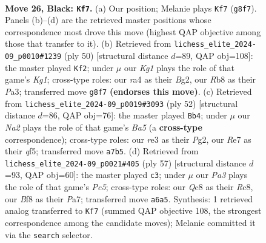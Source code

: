 \documentclass[11pt]{article}
\begin{document}
\clearpage

\begin{figure}[p]\centering
\begin{subfigure}{0.46\textwidth}\centering
\resizebox{\linewidth}{!}{%
\newchessgame
\chessboard[
  setfen={1rq2bk1/n1p1r3/p2p1pp1/3P3p/RP1NP3/4R2P/3B1PP1/1Q4K1 b - - 2 26},
  showmover=false,
  pgfstyle=straightmove, color=movearrow, markmove={g8-f7}
]}
\caption{}
\end{subfigure}\hfill
\begin{subfigure}{0.46\textwidth}\centering
\resizebox{\linewidth}{!}{%
\newchessgame
\chessboard[
  setfen={2rq4/p4pk1/2r1p1p1/1R1p1b1p/3P1P1P/P1P3P1/1Q2P1B1/2R3K1 w - - 3 26},
  showmover=false,
  pgfstyle=straightmove, color=movearrow, markmove={g1-f2}
]}
\caption{}
\end{subfigure}
\\[4pt]
\begin{subfigure}{0.46\textwidth}\centering
\resizebox{\linewidth}{!}{%
\newchessgame
\chessboard[
  setfen={2r2r1k/4b2p/p2ppppP/Bp3q2/8/P3R3/1PPQ1PP1/1K1R4 w - - 2 27},
  showmover=false,
  pgfstyle=straightmove, color=movearrow, markmove={a5-b4}
]}
\caption{}
\end{subfigure}\hfill
\begin{subfigure}{0.46\textwidth}\centering
\resizebox{\linewidth}{!}{%
\newchessgame
\chessboard[
  setfen={2rr3k/p3qpp1/4p2p/1Q2P3/P1pP4/b3P2P/2R2PB1/3R2K1 b - - 0 29},
  showmover=false,
  pgfstyle=straightmove, color=movearrow, markmove={c4-c3}
]}
\caption{}
\end{subfigure}
\caption{\textbf{Move 26, Black: \texttt{Kf7}.} (a) Our position; Melanie plays \texttt{Kf7} (\texttt{g8f7}). Panels (b)--(d) are the retrieved master positions whose correspondence most drove this move (highest QAP objective among those that transfer to it). (b) Retrieved from \texttt{lichess\_elite\_2024-09\_p0010\#1239} (ply 50) [structural distance $d$=89, QAP obj=108]: the master played \texttt{Kf2}; under $\mu$ our \emph{Kg1} plays the role of that game's \emph{Kg1}; cross-type roles: our \emph{r}a4 as their \emph{B}g2, our \emph{R}b8 as their \emph{P}a3; transferred move \texttt{g8f7} \textbf{(endorses this move)}. (c) Retrieved from \texttt{lichess\_elite\_2024-09\_p0019\#3093} (ply 52) [structural distance $d$=86, QAP obj=76]: the master played \texttt{Bb4}; under $\mu$ our \emph{Na2} plays the role of that game's \emph{Ba5} (a \textbf{cross-type} correspondence); cross-type roles: our \emph{r}e3 as their \emph{P}g2, our \emph{R}e7 as their \emph{q}f5; transferred move \texttt{a7b5}. (d) Retrieved from \texttt{lichess\_elite\_2024-09\_p0021\#405} (ply 57) [structural distance $d$=93, QAP obj=60]: the master played \texttt{c3}; under $\mu$ our \emph{Pa3} plays the role of that game's \emph{Pc5}; cross-type roles: our \emph{Q}c8 as their \emph{R}c8, our \emph{B}f8 as their \emph{P}a7; transferred move \texttt{a6a5}. Synthesis: 1 retrieved analog transferred to \texttt{Kf7} (summed QAP objective 108, the strongest correspondence among the candidate moves); Melanie committed it via the \texttt{search} selector.}
\label{fig:thought-m51}
\end{figure}
\end{document}
